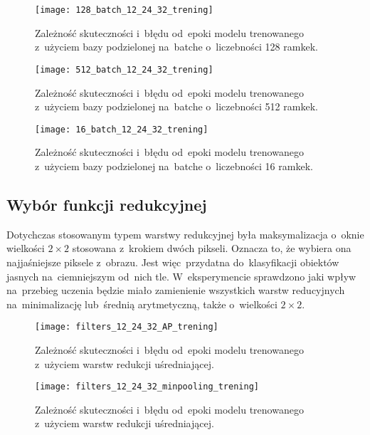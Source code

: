 {\begin{figure}[H]
	\centering
	\centering
		\texttt{[image: 128\_batch\_12\_24\_32\_trening]}	
	\caption{Zależność skuteczności i~błędu od~epoki modelu trenowanego z~użyciem bazy podzielonej na~batche o~liczebności 128 ramkek.}	\label{fig:128_batch_12_24_32_trening}
\end{figure}

\begin{figure}[H]
	\centering
	\centering
		\texttt{[image: 512\_batch\_12\_24\_32\_trening]}	
	\caption{Zależność skuteczności i~błędu od~epoki modelu trenowanego z~użyciem bazy podzielonej na~batche o~liczebności 512 ramkek.}	\label{fig:512_batch_12_24_32_trening}
\end{figure}

\begin{figure}[H]
	\centering
	\centering
		\texttt{[image: 16\_batch\_12\_24\_32\_trening]}	
	\caption{Zależność skuteczności i~błędu od~epoki modelu trenowanego z~użyciem bazy podzielonej na~batche o~liczebności 16 ramkek.}	\label{fig:16_batch_12_24_32_trening}
\end{figure}
}

\subsection{Wybór funkcji redukcyjnej}

Dotychczas stosowanym typem warstwy redukcyjnej była maksymalizacja o~oknie wielkości $2\times2$ stosowana z~krokiem dwóch pikseli. Oznacza to, że wybiera ona najjaśniejsze piksele z~obrazu. Jest więc~przydatna do~klasyfikacji obiektów jasnych na~ciemniejszym od~nich tle. W~eksperymencie sprawdzono jaki wpływ na~przebieg uczenia będzie miało zamienienie wszystkich warstw reducyjnych na~minimalizację lub~średnią arytmetyczną, także o~wielkości $2\times2$. 

\begin{figure}[H]
	\centering
	\centering
		\texttt{[image: filters\_12\_24\_32\_AP\_trening]}	
	\caption{Zależność skuteczności i~błędu od~epoki modelu trenowanego z~użyciem warstw redukcji uśredniającej.}	\label{fig:filters_12_24_32_AP_trening}
\end{figure}

\begin{figure}[H]
	\centering
	\centering
		\texttt{[image: filters\_12\_24\_32\_minpooling\_trening]}	
	\caption{Zależność skuteczności i~błędu od~epoki modelu trenowanego z~użyciem warstw redukcji uśredniającej.}	\label{fig:filters_12_24_32_minpooling_trening}
\end{figure}

